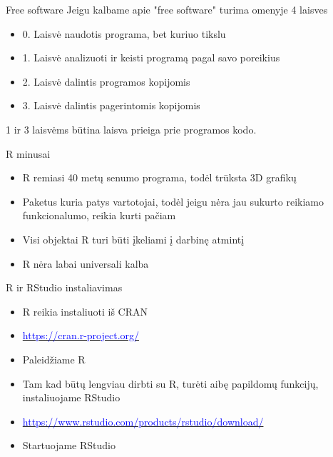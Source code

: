 \documentclass[11pt,xcolor=table]{beamer}
\begin{document}

\begin{frame}{Free software}
Jeigu kalbame apie "free software" turima omenyje 4 laisves
\begin{itemize}
\item 0. Laisvė naudotis programa, bet kuriuo tikslu
\item 1. Laisvė analizuoti ir keisti programą pagal savo poreikius
\item 2. Laisvė dalintis programos kopijomis
\item 3. Laisvė dalintis pagerintomis kopijomis
\end{itemize}
1 ir 3 laisvėms būtina laisva prieiga prie programos kodo.\\
\href{https://www.gnu.org/philosophy/philosophy.html}{\color{blue}{Philosophy of the GNU Project}}
\end{frame}


\begin{frame}{R minusai}
\begin{itemize}
\item R remiasi 40 metų senumo programa, todėl trūksta 3D grafikų 
\item Paketus kuria patys vartotojai, todėl jeigu nėra jau sukurto reikiamo funkcionalumo, reikia kurti pačiam
\item Visi objektai R turi būti įkeliami į darbinę atmintį
\item R nėra labai universali kalba
\end{itemize}
\end{frame}


\begin{frame}{R ir RStudio instaliavimas}
\begin{itemize}
\item R reikia instaliuoti iš CRAN
\item \href{https://cran.r-project.org/}{\textcolor{blue}{https://cran.r-project.org/}}
\item Paleidžiame R 
\item Tam kad būtų lengviau dirbti su R, turėti aibę papildomų funkcijų, instaliuojame RStudio
\item \href{https://www.rstudio.com/products/rstudio/download/}{\textcolor{blue}{https://www.rstudio.com/products/rstudio/download/}}
\item Startuojame RStudio
\end{itemize}
\end{frame}
\end{document}
